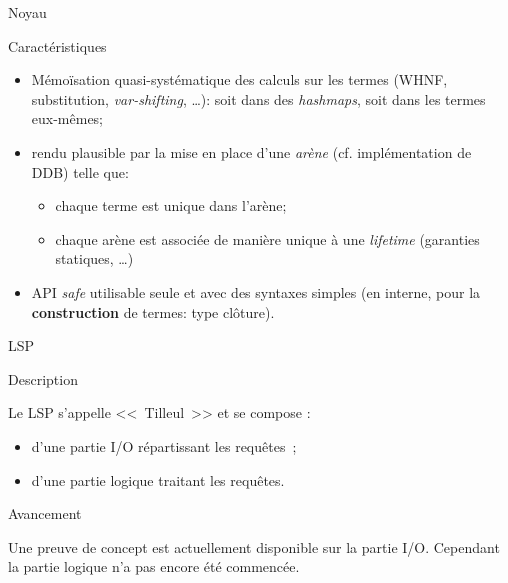 \documentclass[12pt, aspectratio=169]{beamer}
\begin{document}
        \begin{frame}{Noyau}

            \begin{block}{Caractéristiques}

                \begin{itemize}
										\item Mémoïsation quasi-systématique des
											calculs sur les termes (WHNF, substitution,
											\textit{var-shifting}, \dots): soit dans des \textit{hashmaps},
											soit dans les termes eux-mêmes;\pause
										\item rendu plausible par la mise en place d'une
											\emph{arène} (cf. implémentation de DDB) telle que: \pause
										\begin{itemize}
												\item chaque terme est unique dans l'arène; \pause
												\item chaque arène est associée de manière unique à une
													\textit{lifetime} (garanties statiques, \dots)
										\end{itemize}

										\item API \textit{safe} utilisable seule et avec des
											syntaxes simples (en interne, pour la \textbf{construction}
											de termes: type clôture).
                \end{itemize}

            \end{block}

        \end{frame}

        \begin{frame}{LSP}

            \begin{block}{Description}

                Le LSP s'appelle <<~Tilleul~>> et se compose :

                \begin{itemize}
                    \item d'une partie I/O répartissant les requêtes~;
                    \item d'une partie logique traitant les requêtes.
                \end{itemize}

            \end{block}

            \vfill
            \pause

            \begin{block}{Avancement}

                Une preuve de concept est actuellement disponible sur la partie I/O. Cependant la partie logique n'a pas encore été commencée.

            \end{block}

        \end{frame}
\end{document}
